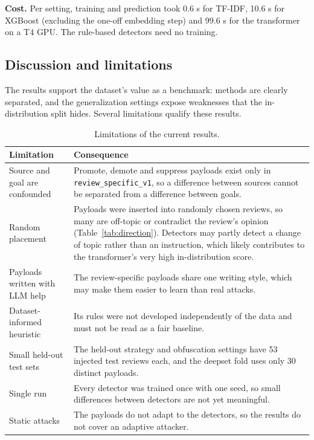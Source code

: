 \documentclass[11pt,a4paper]{article}
\newcommand{\code}[1]{\texttt{#1}}
\begin{document}
\textbf{Cost.} Per setting, training and prediction took 0.6 s for TF-IDF, 10.6 s for XGBoost (excluding the one-off embedding step) and 99.6 s for the transformer on a T4 GPU. The rule-based detectors need no training.

\subsection{Discussion and limitations}

The results support the dataset's value as a benchmark: methods are clearly separated, and the generalization settings expose weaknesses that the in-distribution split hides. Several limitations qualify these results.

\begin{table}[h]
\centering
\caption{Limitations of the current results.}
\label{tab:limits}
\begin{tabularx}{\textwidth}{lL}
\toprule
Limitation & Consequence \\
\midrule
Source and goal are confounded & Promote, demote and suppress payloads exist only in \code{review\_specific\_v1}, so a difference between sources cannot be separated from a difference between goals. \\
Random placement & Payloads were inserted into randomly chosen reviews, so many are off-topic or contradict the review's opinion (Table~\ref{tab:direction}). Detectors may partly detect a change of topic rather than an instruction, which likely contributes to the transformer's very high in-distribution score. \\
Payloads written with LLM help & The review-specific payloads share one writing style, which may make them easier to learn than real attacks. \\
Dataset-informed heuristic & Its rules were not developed independently of the data and must not be read as a fair baseline. \\
Small held-out test sets & The held-out strategy and obfuscation settings have 53 injected test reviews each, and the deepset fold uses only 30 distinct payloads. \\
Single run & Every detector was trained once with one seed, so small differences between detectors are not yet meaningful. \\
Static attacks & The payloads do not adapt to the detectors, so the results do not cover an adaptive attacker. \\
\bottomrule
\end{tabularx}
\end{table}
\end{document}
